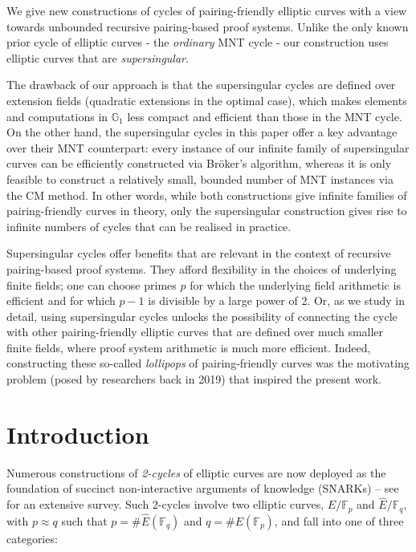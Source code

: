 \documentclass[version=preprint]{iacrcc}
\newcommand{\F}{\mathbb{F}}
\begin{document}
 \begin{textabstract}
 We give new constructions of cycles of pairing-friendly elliptic curves with a view towards unbounded recursive pairing-based proof systems. Unlike the only known prior cycle of elliptic curves - the \emph{ordinary} MNT cycle - our construction uses elliptic curves that are \emph{supersingular}. 

 The drawback of our approach is that the supersingular cycles are defined over extension fields (quadratic extensions in the optimal case), which makes elements and computations in $\mathbb{G}_1$ less compact and efficient than those in the MNT cycle. On the other hand, the supersingular cycles in this paper offer a key advantage over their MNT counterpart: every instance of our infinite family of supersingular curves can be efficiently constructed via Br{\"o}ker's algorithm, whereas it is only feasible to construct a relatively small, bounded number of MNT instances via the CM method. In other words, while both constructions give infinite families of pairing-friendly curves in theory, only the supersingular construction gives rise to infinite numbers of cycles that can be realised in practice. 

 Supersingular cycles offer benefits that are relevant in the context of recursive pairing-based proof systems. They afford flexibility in the choices of underlying finite fields; one can choose primes $p$ for which the underlying field arithmetic is efficient and for which $p-1$ is divisible by a large power of 2. Or, as we study in detail, using supersingular cycles unlocks the possibility of connecting the cycle with other pairing-friendly elliptic curves that are defined over much smaller finite fields, where proof system arithmetic is much more efficient. Indeed, constructing these so-called \emph{lollipops} of pairing-friendly curves was the motivating problem (posed by researchers back in 2019) that inspired the present work. 

 \end{textabstract}


\section{Introduction}\label{sec:intro}

Numerous constructions of \emph{2-cycles} of elliptic curves are now deployed as the foundation of succinct non-interactive arguments of knowledge (SNARKs) -- see~\cite{AHG22} for an extensive survey. Such $2$-cycles involve two elliptic curves, $E/\F_p$ and $\hat{E}/\F_q$, with $p \approx q$ such that $p = \#\hat{E}(\F_q)$ and $q=\#E(\F_p)$, and fall into one of three categories:
\end{document}

